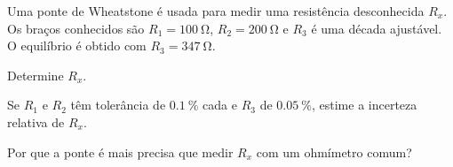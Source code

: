 \begin{questao}[3]{}

Uma ponte de Wheatstone é usada para medir uma resistência desconhecida $R_x$.
Os braços conhecidos são $R_1 = \SI{100}{\ohm}$, $R_2 = \SI{200}{\ohm}$ e
$R_3$ é uma década ajustável. O equilíbrio é obtido com
$R_3 = \SI{347}{\ohm}$.
\begin{itensq}
\item Determine $R_x$.
\item Se $R_1$ e $R_2$ têm tolerância de $\SI{0.1}{\percent}$ cada e $R_3$ de
      $\SI{0.05}{\percent}$, estime a incerteza relativa de $R_x$.
\item Por que a ponte é mais precisa que medir $R_x$ com um ohmímetro comum?
\end{itensq}


\end{questao}

